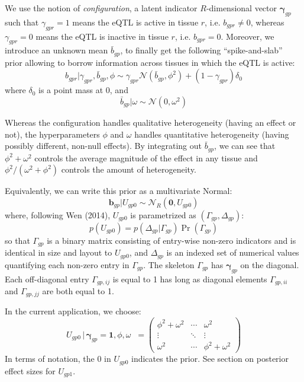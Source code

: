 \documentclass[10pt]{article}
\newcommand{\Prob}{\Pr} %
\newcommand{\Norm}{{\mathcal{N}}} %
\begin{document}
We use the notion of \emph{configuration}, a latent indicator $R$-dimensional vector $\bm{\gamma}_{gp}$ such that $\gamma_{gpr} = 1$ means the eQTL is active in tissue $r$, i.e. $b_{gpr} \ne 0$, whereas $\gamma_{gpr} = 0$ means the eQTL is inactive in tissue $r$, i.e. $b_{gpr} = 0$.
Moreover, we introduce an unknown mean $\bar{b}_{gp}$, to finally get the following ``spike-and-slab'' prior allowing to borrow information across tissues in which the eQTL is active:
\begin{equation}
  b_{gpr} | \gamma_{gpr}, \bar{b}_{gp}, \phi \sim \gamma_{gpr} \Norm(\bar{b}_{gp}, \phi^2) + (1 - \gamma_{gpr}) \delta_0
\end{equation}
where $\delta_0$ is a point mass at 0, and
\begin{equation}
  \bar{b}_{gp} | \omega \sim \Norm(0, \omega^2)
\end{equation}

Whereas the configuration handles qualitative heterogeneity (having an effect or not), the hyperparameters $\phi$ and $\omega$ handles quantitative heterogeneity (having possibly different, non-null effects).
By integrating out $\bar{b}_{gp}$, we can see that $\phi^2 + \omega^2$ controls the average magnitude of the effect in any tissue  and $\phi^2/(\omega^2+\phi^2)$ controls the amount of heterogeneity.

Equivalently, we can write this prior as a multivariate Normal:
\begin{equation}
  \bm{b}_{gp} | U_{gp0} \sim \Norm_R(\bm{0}, U_{gp0})
\end{equation}
where, following Wen (2014), $U_{gp0}$ is parametrized as $(\Gamma_{gp},\Delta_{gp})$:
\begin{equation}
  p(U_{gp0}) = p(\Delta_{gp} | \Gamma_{gp}) \Prob(\Gamma_{gp})
\end{equation}
so that $\Gamma_{gp}$ is a binary matrix consisting of entry-wise non-zero indicators and is identical in size and layout to $U_{gp0}$, and $\Delta_{gp}$ is an indexed set of numerical values quantifying each non-zero entry in $\Gamma_{gp}$.
The skeleton $\Gamma_{gp}$ has $\bm{\gamma}_{gp}$ on the diagonal. Each off-diagonal entry $\Gamma_{gp,ij}$ is equal to 1 has long as diagonal elements $\Gamma_{gp,ii}$ and $\Gamma_{gp,jj}$ are both equal to 1.

In the current application, we choose:
\begin{equation}
  U_{gp0} \, | \, \bm{\gamma}_{gp} = \bm{1}, \phi, \omega \; \; =
  \begin{pmatrix}
    \phi^2 + \omega^2 & \cdots & \omega^2 \\
    \vdots & \ddots & \vdots \\
    \omega^2 & \cdots & \phi^2 + \omega^2
  \end{pmatrix}
\end{equation}
In terms of notation, the $0$ in $U_{gp0}$ indicates the prior. See section on posterior effect sizes for $U_{gp1}$.
\end{document}
